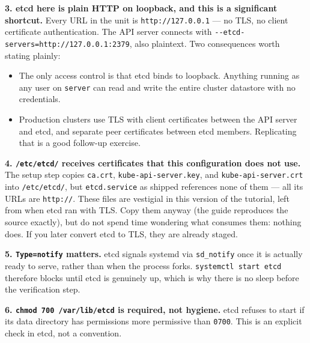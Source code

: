 \documentclass[11pt,oneside]{report}
\providecommand{\tightlist}{%
  \setlength{\itemsep}{0pt}\setlength{\parskip}{0pt}}
\begin{document}
\textbf{3. etcd here
is plain HTTP on
loopback, and this
is a significant
shortcut.} Every URL
in the unit is
\texttt{http:}\allowbreak{}\texttt{/}\allowbreak{}\texttt{/}\allowbreak{}\texttt{127.}\allowbreak{}\texttt{0.}\allowbreak{}\texttt{0.}\allowbreak{}\texttt{1}
--- no TLS, no
client certificate
authentication. The
API server connects
with
\texttt{-\/-etcd-}\allowbreak{}\texttt{servers=http:}\allowbreak{}\texttt{/}\allowbreak{}\texttt{/}\allowbreak{}\texttt{127.}\allowbreak{}\texttt{0.}\allowbreak{}\texttt{0.}\allowbreak{}\texttt{1:}\allowbreak{}\texttt{2379},
also plaintext. Two
consequences worth
stating plainly:

\begin{itemize}
\tightlist
\item
  The only access
  control is that
  etcd binds to
  loopback. Anything
  running as any
  user on
  \texttt{server}
  can read and write
  the entire cluster
  datastore with no
  credentials.
\item
  Production
  clusters use TLS
  with client
  certificates
  between the API
  server and etcd,
  and separate peer
  certificates
  between etcd
  members.
  Replicating that
  is a good
  follow-up
  exercise.
\end{itemize}

\textbf{4.
\texttt{/etc/etcd/}
receives
certificates that
this configuration
does not use.} The
setup step copies
\texttt{ca.crt},
\texttt{kube-}\allowbreak{}\texttt{api-}\allowbreak{}\texttt{server.}\allowbreak{}\texttt{key},
and
\texttt{kube-}\allowbreak{}\texttt{api-}\allowbreak{}\texttt{server.}\allowbreak{}\texttt{crt}
into
\texttt{/etc/etcd/},
but
\texttt{etcd.service}
as shipped
references none of
them --- all its
URLs are
\texttt{http://}.
These files are
vestigial in this
version of the
tutorial, left from
when etcd ran with
TLS. Copy them
anyway (the guide
reproduces the
source exactly), but
do not spend time
wondering what
consumes them:
nothing does. If you
later convert etcd
to TLS, they are
already staged.

\textbf{5.
\texttt{Type=notify}
matters.} etcd
signals systemd via
\texttt{sd\_notify}
once it is actually
ready to serve,
rather than when the
process forks.
\texttt{systemctl\ start\ etcd}
therefore blocks
until etcd is
genuinely up, which
is why there is no
sleep before the
verification step.

\textbf{6.
\texttt{chmod\ 700\ /}\allowbreak{}\texttt{var/}\allowbreak{}\texttt{lib/}\allowbreak{}\texttt{etcd}
is required, not
hygiene.} etcd
refuses to start if
its data directory
has permissions more
permissive than
\texttt{0700}. This
is an explicit check
in etcd, not a
convention.
\end{document}
